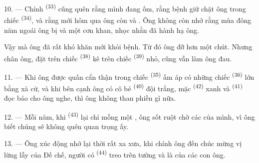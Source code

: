 10. --- Chính  \textsuperscript{(33)} cũng quên rằng mình đang ốm, rằng
bệnh  giữ chặt ông trong chiếc 
\textsuperscript{(34)}, và rằng mới hôm qua ông còn  và . Ông
không còn nhớ rằng mùa đông năm ngoái ông bị  và một cơn 
khan, nhọc nhằn đã hành hạ ông.

Vậy mà ông đã rất khó khăn mới khỏi bệnh. Từ đó ông đỡ hơn một chút. Nhưng chân ông, đặt
trên chiếc  \textsuperscript{(38)} kê trên chiếc 
\textsuperscript{(39)} nhỏ, cũng vẫn làm ông đau.

11. --- Khi ông được quấn cẩn thận trong chiếc 
\textsuperscript{(35)} ấm áp có những chiếc  \textsuperscript{(36)} lớn bằng
xà cừ, và khi bên cạnh ông có cô bé  \textsuperscript{(40)} đội
 trắng, mặc  \textsuperscript{(42)} xanh và  \textsuperscript{(41)} đọc báo cho ông nghe, thì ông không than phiền gì nữa.

12. --- Mỗi năm, khi  \textsuperscript{(43)} lại chỉ  mồng
một , ông sốt ruột chờ các  của mình, vì ông biết chúng
sẽ không quên  quan trọng ấy.

13. --- Ông xúc động nhớ lại thời rất xa xưa, khi chính ông đến chúc mừng vị
 lừng lẫy của Đế chế, người có 
\textsuperscript{(44)} treo trên tường và là  của các con ông.
\VUsaut{6.0mm}
\VUfilet{22mm}
